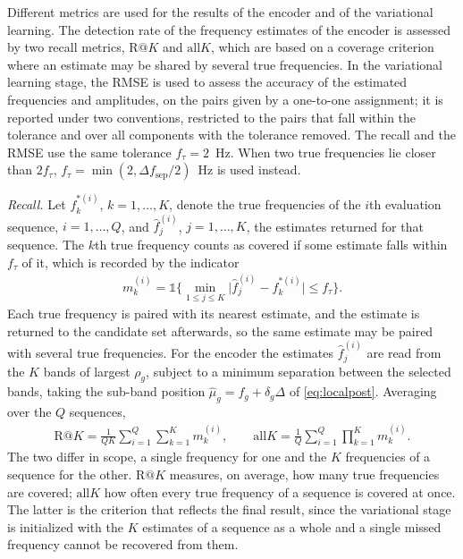 \documentclass[journal,onecolumn]{IEEEtran}
\begin{document}
Different metrics are used for the results of the encoder and of the variational learning. The detection rate of the frequency estimates of the encoder is assessed by two recall metrics, $\mathrm{R}@K$ and $\mathrm{all}K$, which are based on a coverage criterion where an estimate may be shared by several true frequencies. In the variational learning stage, the RMSE is used to assess the accuracy of the estimated frequencies and amplitudes, on the pairs given by a one-to-one assignment; it is reported under two conventions, restricted to the pairs that fall within the tolerance and over all components with the tolerance removed. The recall and the RMSE use the same tolerance $f_{\tau} = 2$~Hz. When two true frequencies lie closer than $2f_{\tau}$, $f_{\tau}=\min(2,\Delta f_{\mathrm{sep}}/2)$~Hz is used instead.

\emph{Recall.} Let $f_k^{\ast(i)}$, $k=1,\dots,K$, denote the true frequencies of the $i$th evaluation sequence, $i=1,\dots,Q$, and $\hat f_j^{(i)}$, $j=1,\dots,K$, the estimates returned for that sequence. The $k$th true frequency counts as covered if some estimate falls within $f_{\tau}$ of it, which is recorded by the indicator
\begin{eqnarray}
\label{eq:covered}
m_k^{(i)}=\mathds{1}\Big\{\min_{1\le j\le K}\big|\hat f_j^{(i)}-f_k^{\ast(i)}\big|\le f_{\tau}\Big\}.
\end{eqnarray}
Each true frequency is paired with its nearest estimate, and the estimate is returned to the candidate set afterwards, so the same estimate may be paired with several true frequencies. For the encoder the estimates $\hat f_j^{(i)}$ are read from the $K$ bands of largest $\rho_g$, subject to a minimum separation between the selected bands, taking the sub-band position $\hat\mu_g=f_g+\delta_g\Delta$ of \eqref{eq:localpost}. Averaging over the $Q$ sequences,
\begin{eqnarray}
\label{eq:recall}
\mathrm{R}@K=\frac{1}{QK}\sum_{i=1}^{Q}\sum_{k=1}^{K}m_{k}^{(i)},
\qquad
\mathrm{all}K=\frac{1}{Q}\sum_{i=1}^{Q}\prod_{k=1}^{K}m_{k}^{(i)}.
\end{eqnarray}
The two differ in scope, a single frequency for one and the $K$ frequencies of a sequence for the other. $\mathrm{R}@K$ measures, on average, how many true frequencies are covered; $\mathrm{all}K$ how often every true frequency of a sequence is covered at once. The latter is the criterion that reflects the final result, since the variational stage is initialized with the $K$ estimates of a sequence as a whole and a single missed frequency cannot be recovered from them.
\end{document}
